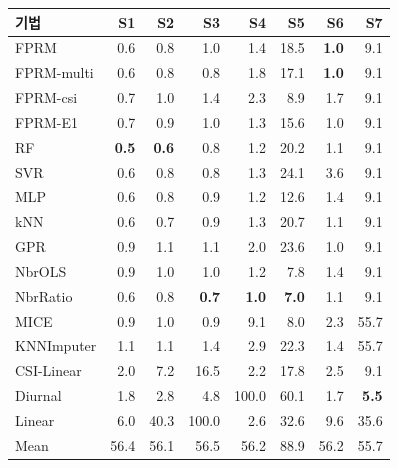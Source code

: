 \begin{tabular}{lrrrrrrr}
\toprule
기법 & S1 & S2 & S3 & S4 & S5 & S6 & S7 \\
\midrule
FPRM & 0.6 & 0.8 & 1.0 & 1.4 & 18.5 & \textbf{1.0} & 9.1 \\
FPRM-multi & 0.6 & 0.8 & 0.8 & 1.8 & 17.1 & \textbf{1.0} & 9.1 \\
FPRM-csi & 0.7 & 1.0 & 1.4 & 2.3 & 8.9 & 1.7 & 9.1 \\
FPRM-E1 & 0.7 & 0.9 & 1.0 & 1.3 & 15.6 & 1.0 & 9.1 \\
\midrule
RF & \textbf{0.5} & \textbf{0.6} & 0.8 & 1.2 & 20.2 & 1.1 & 9.1 \\
SVR & 0.6 & 0.8 & 0.8 & 1.3 & 24.1 & 3.6 & 9.1 \\
MLP & 0.6 & 0.8 & 0.9 & 1.2 & 12.6 & 1.4 & 9.1 \\
kNN & 0.6 & 0.7 & 0.9 & 1.3 & 20.7 & 1.1 & 9.1 \\
GPR & 0.9 & 1.1 & 1.1 & 2.0 & 23.6 & 1.0 & 9.1 \\
\midrule
NbrOLS & 0.9 & 1.0 & 1.0 & 1.2 & 7.8 & 1.4 & 9.1 \\
NbrRatio & 0.6 & 0.8 & \textbf{0.7} & \textbf{1.0} & \textbf{7.0} & 1.1 & 9.1 \\
MICE & 0.9 & 1.0 & 0.9 & 9.1 & 8.0 & 2.3 & 55.7 \\
KNNImputer & 1.1 & 1.1 & 1.4 & 2.9 & 22.3 & 1.4 & 55.7 \\
\midrule
CSI-Linear & 2.0 & 7.2 & 16.5 & 2.2 & 17.8 & 2.5 & 9.1 \\
Diurnal & 1.8 & 2.8 & 4.8 & 100.0 & 60.1 & 1.7 & \textbf{5.5} \\
Linear & 6.0 & 40.3 & 100.0 & 2.6 & 32.6 & 9.6 & 35.6 \\
Mean & 56.4 & 56.1 & 56.5 & 56.2 & 88.9 & 56.2 & 55.7 \\
\bottomrule
\end{tabular}
